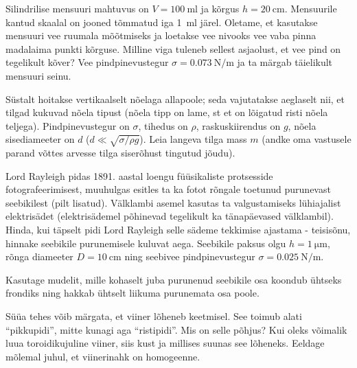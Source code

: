 \documentclass[a4paper,11pt,twocolumn]{article}
\begin{document}
\begin{question}
	Silindrilise mensuuri mahtuvus on \( V = \SI{100}{\ml} \) ja kõrgus \( h = \SI{20}{\cm} \). Mensuurile kantud skaalal on jooned tõmmatud iga \SI{1}{\ml} järel. Oletame, et kasutakse mensuuri vee ruumala mõõtmiseks ja loetakse vee nivooks vee vaba pinna madalaima punkti kõrguse. Milline viga tuleneb sellest asjaolust, et vee pind on tegelikult kõver? Vee pindpinevustegur \( \sigma = \SI{0,073}{\N\per\m} \) ja ta märgab täielikult mensuuri seinu.
\end{question}
\begin{question}
	Süstalt hoitakse vertikaalselt nõelaga allapoole; seda vajutatakse aeglaselt nii, et tilgad kukuvad nõela tipust (nõela tipp on lame, st et on lõigatud risti nõela teljega). Pindpinevustegur on \( \sigma \), tihedus on \( \rho \), raskuskiirendus on \( g \), nõela sisediameeter on \( d \) (\( d \ll \sqrt{\sigma/\rho g} \)). Leia langeva tilga mass \( m \) (andke oma vastusele parand võttes arvesse tilga siserõhust tingutud jõudu).
\end{question}

\begin{question}[E-S 2009, P6][ter5][5cm]
	Lord Rayleigh pidas 1891. aastal loengu füüsikaliste protsesside fotografeerimisest, muuhulgas esitles ta ka fotot rõngale toetunud purunevast seebikilest (pilt lisatud). Välklambi asemel kasutas ta valgustamiseks lühiajalist elektrisädet (elektrisädemel põhinevad tegelikult ka tänapäevased välklambil). Hinda, kui täpselt pidi Lord Rayleigh selle sädeme tekkimise ajastama - teisisõnu, hinnake seebikile purunemisele kuluvat aega. Seebikile paksus olgu \( h = \SI{1}{\micro\m} \), rõnga diameeter \( D = \SI{10}{\cm} \) ning seebivee pindpinevustegur \( \sigma = \SI{0.025}{\N\per\m} \).\\
	\begin{hint}
		Kasutage mudelit, mille kohaselt juba purunenud seebikile osa koondub ühtseks frondiks ning hakkab ühtselt liikuma purunemata osa poole.
	\end{hint}
\end{question}

\begin{question}[200MPPP, P67][ter6][\columnwidth]
	Süüa tehes võib märgata, et viiner lõheneb keetmisel. See toimub alati \enquote{pikkupidi}, mitte kunagi aga \enquote{ristipidi}. Mis on selle põhjus? Kui oleks võimalik luua toroidikujuline viiner, siis kust ja millises suunas see lõheneks. Eeldage mõlemal juhul, et viinerinahk on homogeenne.
\end{question}
	
\end{document}
